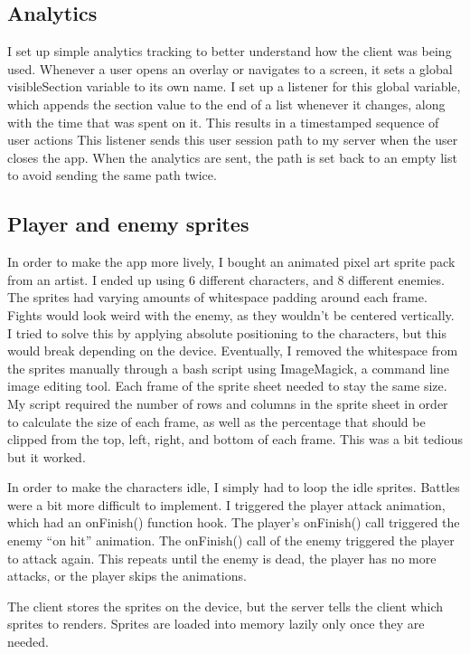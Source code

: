 \documentclass{l4proj}
\begin{document}
\subsection{Analytics}
I set up simple analytics tracking to better understand how the client was being used. Whenever a user opens an overlay or navigates to a screen, it sets a global visibleSection variable to its own name. I set up a listener for this global variable, which appends the section value to the end of a list whenever it changes, along with the time that was spent on it. This results in a timestamped sequence of user actions  This listener sends this user session path to my server when the user closes the app. When the analytics are sent, the path is set back to an empty list to avoid sending the same path twice.

\subsection{Player and enemy sprites}
In order to make the app more lively, I bought an animated pixel art sprite pack from an artist. I ended up using 6 different characters, and 8 different enemies. The sprites had varying amounts of whitespace padding around each frame. Fights would look weird with the enemy, as they wouldn't be centered vertically. I tried to solve this by applying absolute positioning to the characters, but this would break depending on the device. Eventually, I removed the whitespace from the sprites manually through a bash script using ImageMagick, a command line image editing tool. Each frame of the sprite sheet needed to stay the same size. My script required the number of rows and columns in the sprite sheet in order to calculate the size of each frame, as well as the percentage that should be clipped from the top, left, right, and bottom of each frame. This was a bit tedious but it worked.

In order to make the characters idle, I simply had to loop the idle sprites. Battles were a bit more difficult to implement. I triggered the player attack animation, which had an onFinish() function hook. The player's onFinish() call triggered the enemy ``on hit'' animation. The onFinish() call of the enemy triggered the player to attack again. This repeats until the enemy is dead, the player has no more attacks, or the player skips the animations.

The client stores the sprites on the device, but the server tells the client which sprites to renders. Sprites are loaded into memory lazily only once they are needed.
\end{document}
